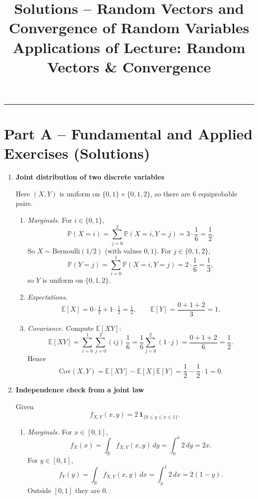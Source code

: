 \documentclass[11pt]{article}
\title{Solutions -- Random Vectors and Convergence of Random Variables\\[0.4em]
{\large Applications of Lecture: Random Vectors \& Convergence}}
\author{}
\date{}
\begin{document}
\maketitle

\bigskip
\hrule
\bigskip

\section*{Part A -- Fundamental and Applied Exercises (Solutions)}

\begin{enumerate}

\item \textbf{Joint distribution of two discrete variables}

Here $(X,Y)$ is uniform on $\{0,1\}\times\{0,1,2\}$, so there are $6$ equiprobable pairs.

\begin{enumerate}
\item \emph{Marginals.}
For $i\in\{0,1\}$,
\[
\mathbb{P}(X=i)=\sum_{j=0}^2 \mathbb{P}(X=i,Y=j)=3\cdot \frac16=\frac12.
\]
So $X\sim \mathrm{Bernoulli}(1/2)$ (with values $0,1$).
For $j\in\{0,1,2\}$,
\[
\mathbb{P}(Y=j)=\sum_{i=0}^1 \mathbb{P}(X=i,Y=j)=2\cdot\frac16=\frac13,
\]
so $Y$ is uniform on $\{0,1,2\}$.

\item \emph{Expectations.}
\[
\mathbb{E}[X]=0\cdot \tfrac12 + 1\cdot \tfrac12 = \tfrac12,
\qquad
\mathbb{E}[Y]=\frac{0+1+2}{3}=1.
\]

\item \emph{Covariance.}
Compute $\mathbb{E}[XY]$:
\[
\mathbb{E}[XY]=\sum_{i=0}^1\sum_{j=0}^2 (ij)\,\frac16
=\frac16 \sum_{j=0}^2 (1\cdot j) = \frac{0+1+2}{6}=\frac12.
\]
Hence
\[
\mathrm{Cov}(X,Y)=\mathbb{E}[XY]-\mathbb{E}[X]\mathbb{E}[Y]
=\frac12-\frac12\cdot 1 = 0.
\]
\end{enumerate}

\bigskip

\item \textbf{Independence check from a joint law}

Given
\[
f_{X,Y}(x,y)=2\,\mathbf{1}_{\{0\le y\le x\le 1\}}.
\]

\begin{enumerate}
\item \emph{Marginals.}
For $x\in[0,1]$,
\[
f_X(x)=\int_{\mathbb{R}} f_{X,Y}(x,y)\,dy=\int_{0}^{x} 2\,dy = 2x.
\]
For $y\in[0,1]$,
\[
f_Y(y)=\int_{\mathbb{R}} f_{X,Y}(x,y)\,dx=\int_{y}^{1} 2\,dx = 2(1-y).
\]
Outside $[0,1]$ they are $0$.


\end{enumerate}
\end{enumerate}
\end{document}
